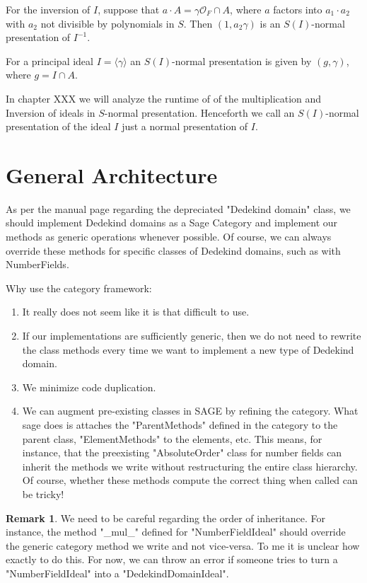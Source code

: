 \documentclass{amsart}
\theoremstyle{definition}
\newtheorem*{remark*}{Remark}
\def\oo{\mathcal{O}}
\begin{document}
For the inversion of $I$, suppose that $a\cdot A = \gamma\oo_F\cap A$, where $a$ factors into $a_1\cdot a_2$ with $a_2$ not divisible by polynomials in $S$. Then $(1,a_2\gamma)$ is an $S(I)$-normal presentation of $I^{-1}$. 

For a principal ideal $I = \langle \gamma\rangle$ an $S(I)$-normal presentation is given by $(g,\gamma)$, where $g= I\cap A$.

In chapter XXX we will analyze the runtime of of the multiplication and Inversion of ideals in $S$-normal presentation. Henceforth we call an $S(I)$-normal presentation of the ideal $I$ just a normal presentation  of $I$.


	
	\section{General Architecture}
	
			As per the manual page regarding the depreciated "Dedekind domain" class, we should implement Dedekind domains as a Sage Category and implement our methods as generic operations whenever possible. Of course, we can always override these methods for specific classes of Dedekind domains, such as with NumberFields.
			
			\bigskip
			
			Why use the category framework:
			\begin{enumerate}
				\item 
					It really does not seem like it is that difficult to use.
				\item
					If our implementations are sufficiently generic, then we do not need to rewrite the class methods every time we want to implement a new type of Dedekind domain.
				\item
					We minimize code duplication.
				\item
					We can augment pre-existing classes in SAGE by refining the category. What sage does is attaches the "ParentMethods" defined in the category to the parent class, "ElementMethods" to the elements, etc. This means, for instance, that the preexisting "AbsoluteOrder" class for number fields can inherit the methods we write without restructuring the entire class hierarchy. Of course, whether these methods compute the correct thing when called can be tricky!
				\end{enumerate}
			
			\begin{remark*}
				We need to be careful regarding the order of inheritance. For instance, the method "\_mul\_" defined for "NumberFieldIdeal" should override the generic category method we write and not vice-versa. To me it is unclear how exactly to do this. For now, we can throw an error if someone tries to turn a "NumberFieldIdeal" into a "DedekindDomainIdeal".
			\end{remark*}
			
\end{document}
